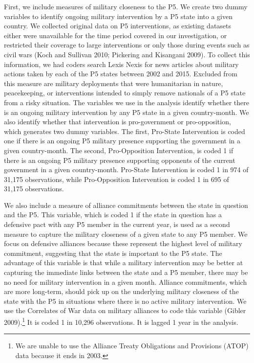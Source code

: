 First, we include measures of military closeness to the P5.  We create two dummy variables to identify ongoing military intervention by a P5 state into a given country.  We collected original data on P5 interventions, as existing datasets either were unavailable for the time period covered in our investigation, or restricted their coverage to large interventions or only those during events such as civil wars (Koch and Sullivan 2010; Pickering and Kisangani 2009).  To collect this information, we had coders search Lexis Nexis for news articles about military actions taken by each of the P5 states between 2002 and 2015.  Excluded from this measure are military deployments that were humanitarian in nature, peacekeeping, or interventions intended to simply remove nationals of a P5 state from a risky situation.  The variables we use in the analysis identify whether there is an ongoing military intervention by any P5 state in a given country-month.  We also identify whether that intervention is pro-government or pro-opposition, which generates two dummy variables.  The first, Pro-State Intervention is coded one if there is an ongoing P5 military presence supporting the government in a given country-month.  The second, Pro-Opposition Intervention, is coded 1 if there is an ongoing P5 military presence supporting opponents of the current government in a given country-month.  Pro-State Intervention is coded 1 in 974 of 31,175 observations, while Pro-Opposition Intervention is coded 1 in 695 of 31,175 observations.

We also include a measure of alliance commitments between the state in question and the P5.  This variable, which is coded 1 if the state in question has a defensive pact with any P5 member in the current year, is used as a second measure to capture the military closeness of a given state to any P5 member.  We focus on defensive alliances because these represent the highest level of military commitment, suggesting that the state is important to the P5 state. The advantage of this variable is that while a military intervention may be better at capturing the immediate links between the state and a P5 member, there may be no need for military intervention in a given month.  Alliance commitments, which are more long-term, should pick up on the underlying military closeness of the state with the P5 in situations where there is no active military intervention. We use the Correlates of War data on military alliances to code this variable (Gibler 2009).\footnote{We are unable to use the Alliance Treaty Obligations and Provisions (ATOP) data because it ends in 2003.} It is coded 1 in 10,296 observations.  It is lagged 1 year in the analysis.

